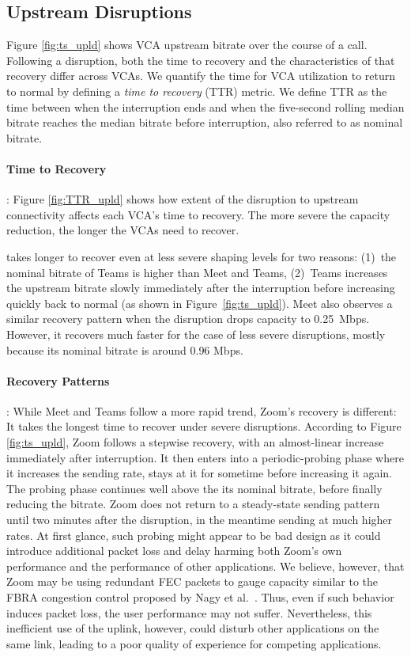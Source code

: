 \subsection{Upstream Disruptions}

Figure \ref{fig:ts_upld} shows VCA upstream bitrate over the course of a
call. Following a disruption, both the time to recovery and the
characteristics of that recovery
differ across VCAs. We quantify the time for
VCA utilization to return to normal by defining a 
\textit{time to recovery} (TTR) metric. We define TTR as the time between when the
interruption ends and when the five-second rolling median bitrate reaches the
median bitrate before interruption, also referred to as nominal bitrate. 

\paragraph{Time to Recovery}: Figure \ref{fig:TTR_upld} shows how extent of
the disruption to upstream connectivity affects each VCA's time to recovery.
The more severe the capacity reduction, the longer the VCAs need to recover.

\teams takes longer to recover even at less severe shaping levels for two
reasons: (1)~the nominal bitrate of Teams is higher than Meet and Teams,
(2)~Teams increases the upstream bitrate slowly immediately after the
interruption before increasing quickly back to normal (as shown in
Figure~\ref{fig:ts_upld}). Meet also observes a similar recovery pattern when
the disruption drops capacity to 0.25~Mbps. However, it recovers much faster
for the case of less severe disruptions, mostly because its nominal bitrate is
around 0.96 Mbps. 

\paragraph{Recovery Patterns}: While Meet and Teams follow a more rapid trend,
Zoom's recovery is different: It takes the longest time to recover under
severe disruptions. According to Figure \ref{fig:ts_upld}, Zoom follows a
stepwise recovery, with an almost-linear increase immediately after
interruption. It then enters into a periodic-probing phase where it increases
the sending rate, stays at it for sometime before increasing it again. The
probing phase continues well above the its nominal bitrate, before finally
reducing the bitrate.  Zoom does not return to a steady-state sending pattern
until two minutes after the disruption, in the meantime sending at much higher
rates. At first glance, such probing might appear to be bad design as it could
introduce additional packet loss and delay harming both Zoom's own performance
and the performance of other applications.  We believe, however, that Zoom may
be using redundant FEC packets to gauge capacity similar to the
FBRA congestion control proposed by Nagy et al.~\cite{nagy2014congestion}.
Thus, even if such behavior induces packet loss, the user performance may not
suffer. Nevertheless, this inefficient use of the uplink, however, could
disturb other applications on the same link, leading to a poor quality of
experience for competing applications. 

